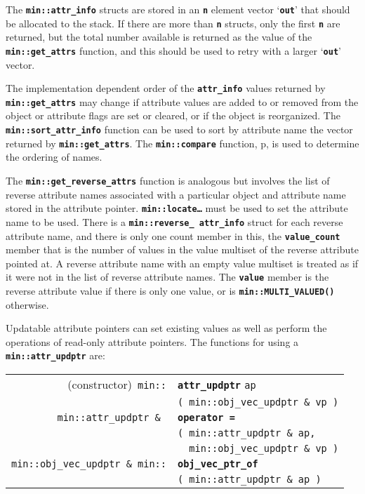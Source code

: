 \documentclass[12pt]{article}
\makeatletter
\newcommand{\TT}[1]{{\tt \bfseries #1}}
\newcommand{\ttindex}[1]{\index{#1@{\tt #1}}}
\newcommand{\ttmindex}[2]{\index{#1@{\tt #1}!#2}}
\newcommand{\ttomkey}[3]{\TT{operator #2}\index{#1@{\tt operator #2}!{#3}}}
\newcommand{\pagref}[1]{p\pageref{#1}}
\newcommand{\EOL}{\penalty \exhyphenpenalty}
\newenvironment{indpar}[1][0.3in]%
	{\begin{list}{}%
		     {\setlength{\itemsep}{0in}%
		      \setlength{\topsep}{0in}%
		      \setlength{\parsep}{1ex}%
		      \setlength{\labelwidth}{#1}%
		      \setlength{\leftmargin}{#1}%
		      \addtolength{\leftmargin}{\labelsep}}%
	 \item}%
	{\end{list}}
\newcommand{\LABEL}[1]{\label{#1}}
\newlength{\ARGBREAKLENGTH}
\newcommand{\ARGBREAK}[1][\ARGBREAKLENGTH]{\\&\hspace*{#1}}
\newcommand{\TTOMKEY}[3]{\ttomkey{#1}{#2}{#3}}
\newcommand{\MINKEY}[1]%
	   {\TT{#1}\ttindex{min::#1}\ttindex{#1}}
\newcommand{\MINMKEY}[2]%
           {\TT{#1}\ttmindex{min::#1}{#2}\ttmindex{#1}{#2}}
\makeatother
\begin{document}
The \TT{min::\EOL attr\_\EOL info} structs are stored in an \TT{n}
element vector `\TT{out}'
that should be allocated to the stack.  If there are more than
\TT{n} structs, only the first \TT{n}
are returned, but the total number available is returned as the value of
the \TT{min::\EOL get\_\EOL attrs} function, and this should be used
to retry with a larger `\TT{out}' vector.

The implementation dependent order of the \TT{attr\_info}
values returned by \TT{min::\EOL get\_\EOL attrs} may change if attribute
values are added to or removed from the object or
attribute flags are set or cleared, or if the object is reorganized.
The \TT{min::\EOL sort\_\EOL attr\_\EOL info} function can be used
to sort by attribute name the
vector returned by \TT{min::\EOL get\_\EOL attrs}.
The \TT{min::\EOL compare} function, \pagref{MIN::COMPARE},
is used to determine the ordering of names.

The \TT{min::\EOL get\_\EOL reverse\_\EOL attrs}
function is analogous but involves the list of
reverse attribute names associated
with a particular object and attribute name stored in the attribute
pointer.
\TT{min::locate\ldots} must be used to set the attribute name to be used.
There is a \TT{min::\EOL reverse\_\EOL
attr\_\EOL info} struct for each reverse attribute name, and there is only
one count member in this, the \TT{value\_count} member that is the number
of values in the value multiset of the reverse attribute pointed at.
A reverse attribute name with an empty value multiset is treated as if it
were not in the list of reverse attribute names.
The \TT{value} member is the reverse attribute value if there is only one
value, or is \TT{min::\EOL MULTI\_\EOL VALUED()} otherwise.

Updatable attribute pointers can set existing values as well as perform
the operations of read-only attribute pointers.
The functions for using a \TT{min::\EOL attr\_\EOL updptr}
are:\label{UPDATABLE-ATTRIBUTE-FUNCTIONS}

\begin{indpar}\begin{tabular}{r@{}l}
(constructor)~\verb|min::|
	& \MINKEY{attr\_updptr} \verb|ap|\ARGBREAK
	  \verb|( min::obj_vec_updptr & vp )|
\LABEL{MIN::ATTR_UPDPTR_OF_OBJ_VEC_UPDPTR} \\
\verb|min::attr_updptr & |
	& \TTOMKEY{=}{=}{of {\tt min::attr\_updptr}}\ARGBREAK
	  \verb|( min::attr_updptr & ap,|\ARGBREAK
	  \verb|  min::obj_vec_updptr & vp )|
\LABEL{MIN::=ATTR_UPDPTR_OF_OBJ_VEC_UPDPTR} \\
\verb|min::obj_vec_updptr & min::|
	& \MINMKEY{obj\_vec\_ptr\_of}{of {\tt attr\_updptr}}\ARGBREAK
	  \verb|( min::attr_updptr & ap )|
\LABEL{MIN::OBJ_VEC_PTR_OF_ATTR_UPDPTR} \\
\end{tabular}\end{indpar}
\end{document}
